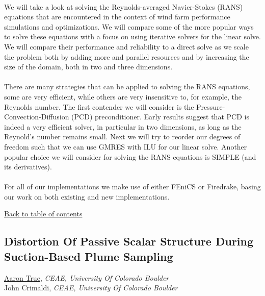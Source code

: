 \vspace{-0.1 in} \\ 
\noindent We will take a look at solving the Reynolds-averaged Navier-Stokes (RANS) equations that are encountered in the context of wind farm performance simulations and optimizations. We will compare some of the more popular ways to solve these equations with a focus on using iterative solvers for the linear solve. We will compare their performance and reliability to a direct solve as we scale the problem both by adding more and parallel resources and by increasing the size of the domain, both in two and three dimensions. \\ 
\noindent  \\ 
\noindent There are many strategies that can be applied to solving the RANS equations, some are very efficient, while others are very insensitive to, for example, the Reynolds number. The first contender we will consider is the Pressure-Convection-Diffusion (PCD) preconditioner. Early results suggest that PCD is indeed a very efficient solver, in particular in two dimensions, as long as the Reynold's number remains small. Next we will try to reorder our degrees of freedom such that we can use GMRES with ILU for our linear solve. Another popular choice we will consider for solving the RANS equations is SIMPLE (and its derivatives). \\ 
\noindent  \\ 
\noindent For all of our implementations we make use of either FEniCS or Firedrake, basing our work on both existing and new implementations. \\ 
\begin{flushright}\vspace{-0.2 in}\hyperlink{toc}{Back to table of contents}\end{flushright}\vspace{-0.2 in}
\hypertarget{AaronTrue}{\subsection*{\color{CUGOLD} Distortion Of Passive Scalar Structure During Suction-Based Plume Sampling}} \vsp 
\underline{Aaron True}, \textit{CEAE, University Of Colorado Boulder}\\ 
{John Crimaldi}, \textit{CEAE, University Of Colorado Boulder}\\ 
\vspace{-0.1 in} \\ 

